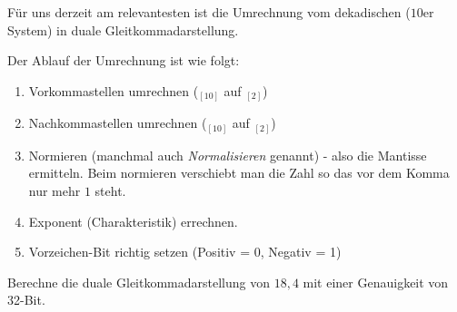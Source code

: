 \documentclass{article}
\begin{document}
Für uns derzeit am relevantesten ist die Umrechnung vom dekadischen ($10$er System) in duale Gleitkommadarstellung.

Der Ablauf der Umrechnung ist wie folgt:

\begin{enumerate}[(1)]
    \item  Vorkommastellen umrechnen  ($_{[10]}$ auf $_{[2]}$)
    \item  Nachkommastellen umrechnen ($_{[10]}$ auf $_{[2]}$)
    \item  Normieren (manchmal auch \emph{Normalisieren} genannt) - also die Mantisse ermitteln. Beim normieren verschiebt man die Zahl so das vor dem Komma nur mehr $1$ steht.
    \item Exponent (Charakteristik) errechnen.
    \item  Vorzeichen-Bit richtig setzen (Positiv = 0, Negativ = 1)
\end{enumerate}

\begin{question}[]
    Berechne die duale Gleitkommadarstellung von $18,4$ mit einer Genauigkeit von 32-Bit.
\end{question}
\end{document}
